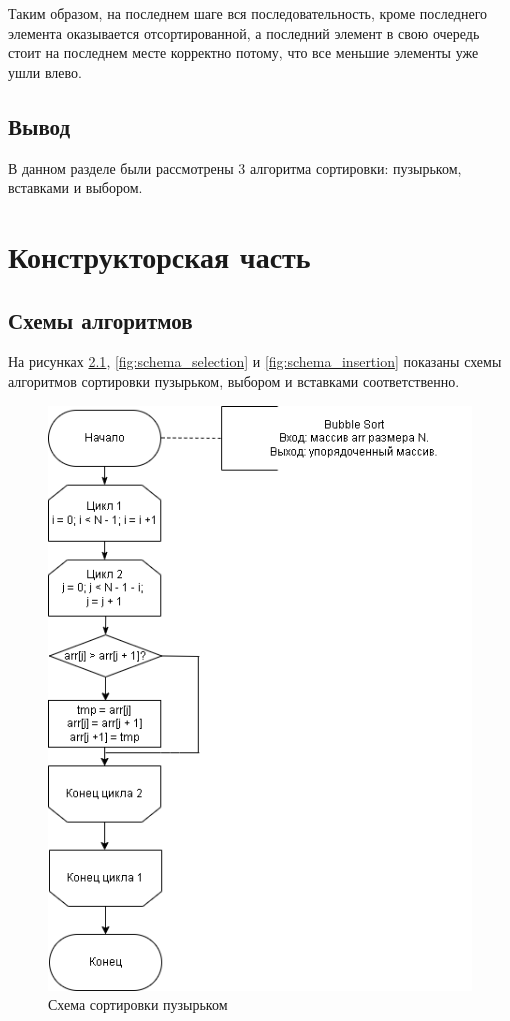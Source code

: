\documentclass[12pt]{report}
\begin{document}
	Таким образом, на последнем шаге вся последовательность, кроме последнего элемента оказывается отсортированной, а последний элемент в свою очередь стоит на последнем месте корректно потому, что все меньшие элементы уже ушли влево.
	
	\section{Вывод}
	
	В данном разделе были рассмотрены 3 алгоритма сортировки: пузырьком, вставками и выбором.
	
	\clearpage
	
	\chapter{Конструкторская часть}
	
	\section{Схемы алгоритмов}
	
	На рисунках \ref{fig:schema_bubble}, \ref{fig:schema_selection} и \ref{fig:schema_insertion} показаны схемы алгоритмов сортировки пузырьком, выбором и вставками соответственно.
	
	\begin{figure}[h]
		\centering
		\includegraphics[width=0.9\linewidth]{bubble}
		\caption{Схема сортировки пузырьком}
		\label{fig:schema_bubble}
	\end{figure}
	
\end{document}

